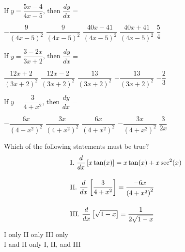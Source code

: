 \begin{questions}
    \question If $y = \dfrac{5x - 4}{4x - 5}$, then $\dfrac{dy}{dx} = $ \\

    \begin{oneparchoices}
        \choice $-\dfrac{9}{(4x - 5)^2}$
        \choice $\dfrac{9}{(4x - 5)^2}$ 
        \choice $\dfrac{40x - 41}{(4x - 5)^2}$
        \choice $\dfrac{40x + 41}{(4x - 5)^2}$
        \choice $\dfrac{5}{4}$
    \end{oneparchoices} \par \horizontalline

    \question If $y = \dfrac{3 - 2x}{3x + 2}$, then $\dfrac{dy}{dx} = $ \\

    \begin{oneparchoices}
        \choice $\dfrac{12x + 2}{(3x + 2)^2}$
        \choice $\dfrac{12x - 2}{(3x + 2)^2}$
        \choice $\dfrac{13}{(3x + 2)^2}$
        \choice $-\dfrac{13}{(3x + 2)^2}$
        \choice $-\dfrac{2}{3}$
    \end{oneparchoices} \par \horizontalline

    \question If $y = \dfrac{3}{4 + x^2}$, then $\dfrac{dy}{dx} = $ \\

    \begin{oneparchoices}
        \choice $-\dfrac{6x}{\left(4 + x^2\right)^2}$
        \choice $\dfrac{3x}{\left(4 + x^2\right)^2}$
        \choice $\dfrac{6x}{\left(4 + x^2\right)^2}$
        \choice $-\dfrac{3x}{\left(4 + x^2\right)^2}$
        \choice $\dfrac{3}{2x}$
    \end{oneparchoices} \par \horizontalline

    \question Which of the following statements must be true? \begin{align*}
        & \text{I. } \dfrac{d}{dx} \left[x\tan (x)\right] = x\tan (x) + x\sec^2 (x) \\[11pt]
        & \text{II. } \dfrac{d}{dx} \left[\dfrac{3}{4 + x^2}\right] = \dfrac{-6x}{\left(4 + x^2\right)^2} \\[11pt]
        & \text{III. } \dfrac{d}{dx} \left[\sqrt{1 - x}\right] = \dfrac{1}{2\sqrt{1 - x}}
    \end{align*}

    \begin{oneparchoices}
        \choice I only 
        \choice II only 
        \choice III only \\[11pt]
        \makebox[0.2 \textwidth] \choice I and II only 
        \makebox[0.25 \textwidth] \choice I, II, and III
    \end{oneparchoices} \par \horizontalline
\end{questions}